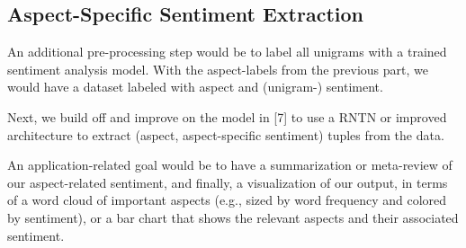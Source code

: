 \documentclass{article} %
\begin{document}
\subsection{Aspect-Specific Sentiment Extraction}

An additional pre-processing step would be to label all unigrams with a trained sentiment analysis model. With the aspect-labels from the previous part, we would have a dataset labeled with aspect and (unigram-) sentiment.

Next, we build off and improve on the model in [7] to use a RNTN or improved architecture to extract (aspect, aspect-specific sentiment) tuples from the data.





An application-related goal would be to have a summarization or meta-review of our aspect-related sentiment, and finally, a visualization of our output, in terms of a word cloud of important aspects (e.g., sized by word frequency and colored by sentiment), or a bar chart that shows the relevant aspects and their associated sentiment.
\end{document}
